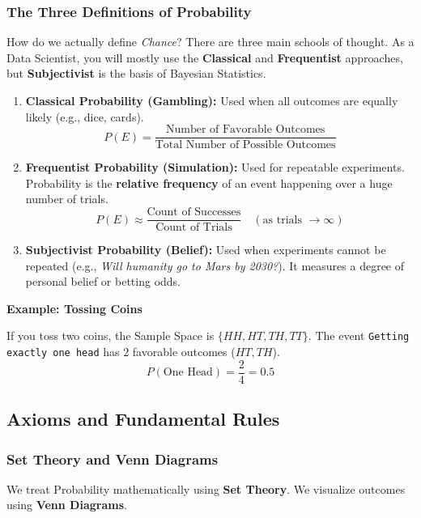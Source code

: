 \subsubsection{The Three Definitions of Probability}

How do we actually define \textit{Chance}? There are three main schools of thought. As a Data Scientist, you will mostly use the \textbf{Classical} and \textbf{Frequentist} approaches, but \textbf{Subjectivist} is the basis of Bayesian Statistics.

\begin{enumerate}
    \item \textbf{Classical Probability (Gambling):}
    Used when all outcomes are equally likely (e.g., dice, cards).
    \[ P(E) = \frac{\text{Number of Favorable Outcomes}}{\text{Total Number of Possible Outcomes}} \]

\vs
    \item \textbf{Frequentist Probability (Simulation):}
    Used for repeatable experiments. Probability is the \textbf{relative frequency} of an event happening over a huge number of trials.
    \[ P(E) \approx \frac{\text{Count of Successes}}{\text{Count of Trials}} \quad (\text{as trials } \to \infty) \]

\vs
    \item \textbf{Subjectivist Probability (Belief):}
    Used when experiments cannot be repeated (e.g., \textit{Will humanity go to Mars by 2030?}). It measures a degree of personal belief or betting odds.
\end{enumerate}

\begin{example}{\textbf{Example: Tossing Coins}}

If you toss two coins, the Sample Space is $\{HH, HT, TH, TT\}$.
The event \texttt{Getting exactly one head} has 2 favorable outcomes ($HT, TH$).
\[ P(\text{One Head}) = \frac{2}{4} = 0.5 \]
\end{example}

\pagebreak
\subsection{Axioms and Fundamental Rules}

\subsubsection{Set Theory and Venn Diagrams}
We treat Probability mathematically using \textbf{Set Theory}. We visualize outcomes using \textbf{Venn Diagrams}.

